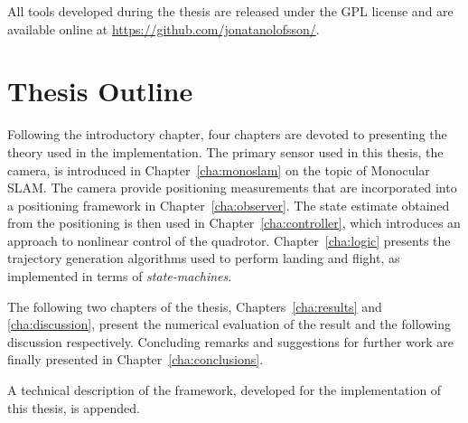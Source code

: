     All tools developed during the thesis are released under the GPL license
    and are available online at \url{https://github.com/jonatanolofsson/}.

\section{Thesis Outline}
    Following the introductory chapter, four chapters are devoted to
    presenting the theory used in the implementation.
    The primary sensor used in this thesis, the camera, is introduced
    in Chapter~\ref{cha:monoslam} on the topic of Monocular SLAM.
    The camera provide positioning measurements that are incorporated
    into a positioning framework in Chapter~\ref{cha:observer}.
    The state estimate obtained from the positioning is then used in Chapter~\ref{cha:controller},
    which introduces an approach to nonlinear control of the quadrotor.
    Chapter~\ref{cha:logic} presents the trajectory generation algorithms
    used to perform landing and flight, as implemented in terms of \textit{state-machines}.

    The following two chapters of the thesis, Chapters~\ref{cha:results} and \ref{cha:discussion}, present the
    numerical evaluation of the result and the following discussion respectively.
    Concluding remarks and suggestions for further work are finally presented in Chapter~\ref{cha:conclusions}.

    A technical description of the \crap framework, developed for the
    implementation of this thesis, is appended.
